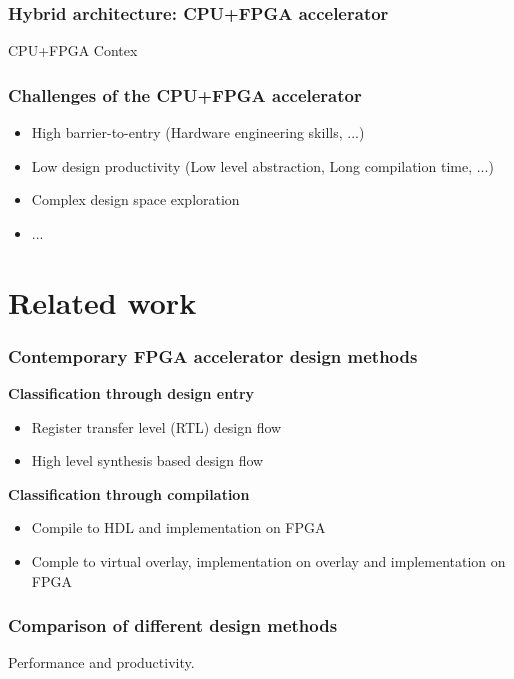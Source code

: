 \documentclass{beamer}
\begin{document}
\begin{frame}[t]
\frametitle{Hybrid architecture: CPU+FPGA accelerator}
CPU+FPGA Contex
\end{frame}

\begin{frame}[t]
\frametitle{Challenges of the CPU+FPGA accelerator}
\begin{itemize}
\item High barrier-to-entry (Hardware engineering skills, ...)
\item Low design productivity (Low level abstraction, Long compilation time, ...)
\item Complex design space exploration
\item ...
\end{itemize}
\end{frame}

\section{Related work}
\begin{frame}
\frametitle{Contemporary FPGA accelerator design methods}
\textbf{Classification through design entry}
\begin{itemize}
\item Register transfer level (RTL) design flow
\item High level synthesis based design flow
\end{itemize}

\textbf{Classification through compilation}
\begin{itemize}
\item Compile to HDL and implementation on FPGA
\item Comple to virtual overlay, implementation on overlay and implementation on FPGA
\end{itemize}

\end{frame}

\begin{frame}

\frametitle{Comparison of different design methods}
Performance and productivity.

\end{frame}
\end{document}
